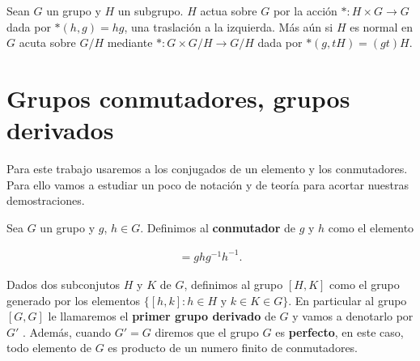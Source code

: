 \begin{ej}
Sean $G$ un grupo y $H$ un subgrupo. $H$ actua sobre $G$ por la acción $*:H \times G \to G$ dada por $*(h,g)=hg$, una traslación a la izquierda.  Más aún si $H$ es normal en $G$ acuta sobre $G/H$ mediante $*:G \times G/H \to G/H$ dada por $*(g,tH)=(gt)H.$ 
 \end{ej}

\section*{Grupos conmutadores, grupos derivados}
Para este trabajo usaremos a los conjugados de un elemento y los conmutadores. Para ello vamos a estudiar un poco de notación y de teoría para acortar nuestras demostraciones. 

\begin{df}
Sea $G$ un grupo y $g$, $h \in G$. Definimos al \textbf{conmutador} de $g$ y $h$ como el elemento 

\begin{align*}
[g,h]=ghg^{-1}h^{-1}.
\end{align*}

Dados dos subconjutos $H$ y $K$ de $G$, definimos al grupo $[H,K]$ como el grupo generado por los elementos $\{[h,k]:h \in H \text{ y }k \in K \in G \}$. En particular al grupo $[G,G]$ le llamaremos el \textbf{primer grupo derivado} de $G$ y vamos a denotarlo por $G'$ . Además, cuando $ G' = G $ diremos que el grupo $G$ es \textbf{perfecto}, en este caso, todo elemento de $G$ es producto de un numero finito de conmutadores. 
\end{df}
	
